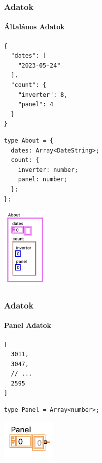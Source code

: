 \documentclass{beamer}
\begin{document}
\begin{frame}[fragile]
  \frametitle{Adatok}
  \framesubtitle{Általános Adatok}

  \begin{minipage}{.35\textwidth}
    \begin{verbatim}
{
  "dates": [ 
    "2023-05-24"
  ],
  "count": {
    "inverter": 8,
    "panel": 4
  }
}
    \end{verbatim}
  \end{minipage}\begin{minipage}{.45\textwidth}
    \begin{verbatim}
type About = {
  dates: Array<DateString>;
  count: {
    inverter: number;
    panel: number;
  };
};
    \end{verbatim}
  \end{minipage}\begin{minipage}{.15\textwidth}
    \flushright
    \includegraphics[height=4cm]{static/lv-about.png}
  \end{minipage}

\end{frame}

\begin{frame}[fragile]
  \frametitle{Adatok}
  \framesubtitle{Panel Adatok}

  \begin{minipage}[fontsize=\small]{.25\textwidth}
    \begin{verbatim}
[
  3011,
  3047,
  // ...
  2595
]
    \end{verbatim}
  \end{minipage}\begin{minipage}{.5\textwidth}
    \begin{verbatim}
type Panel = Array<number>;
    \end{verbatim}
  \end{minipage}\begin{minipage}{.25\textwidth}
    \flushright
    \includegraphics[height=2cm]{static/lv-panel.png}
  \end{minipage}
\end{frame}
\end{document}

